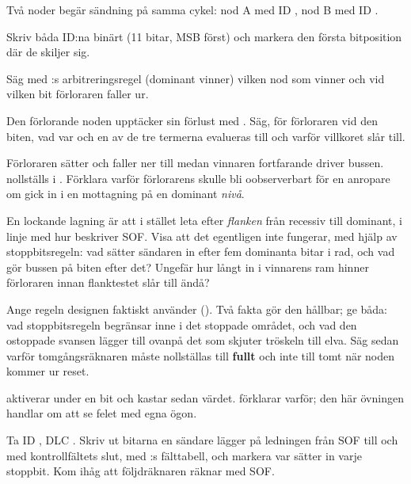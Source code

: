 \label{c17:ex:arbhand}
Två noder begär sändning på samma cykel: nod A med ID , nod B med ID .

 Skriv båda ID:na binärt (11 bitar, MSB först) och markera den första bitposition där de
skiljer sig.

 Säg med :s arbitreringsregel (dominant  vinner) vilken
nod som vinner och vid vilken bit förloraren faller ur.

 Den förlorande noden upptäcker sin förlust med
. Säg, för förloraren vid den biten,
vad var och en av de tre termerna evalueras till och varför villkoret slår till.

 Förloraren sätter  och faller ner till  medan vinnaren
fortfarande driver bussen.  nollställs i . Förklara varför förlorarens
 skulle bli oobserverbart för en anropare om  gick in i en mottagning på
en dominant \emph{nivå}.

 En lockande lagning är att i stället leta efter \emph{flanken} från recessiv till dominant,
i linje med hur  beskriver SOF. Visa att det egentligen inte fungerar,
med hjälp av stoppbitsregeln: vad sätter sändaren in efter fem dominanta bitar i rad, och vad gör
bussen på biten efter det? Ungefär hur långt in i vinnarens ram hinner förloraren innan flanktestet
slår till ändå?

 Ange regeln designen faktiskt använder (). Två fakta gör den
hållbar; ge båda: vad stoppbitsregeln begränsar inne i det stoppade området, och vad den ostoppade
svansen lägger till ovanpå det som skjuter tröskeln till elva. Säg sedan varför tomgångsräknaren
måste nollställas till \textbf{fullt} och inte till tomt när noden kommer ur reset.

\label{c17:ex:sof}
 aktiverar  under en bit och kastar sedan värdet.
 förklarar varför; den här övningen handlar om att se felet med egna ögon.

 Ta ID , DLC . Skriv ut bitarna en sändare lägger på ledningen från SOF
till och med kontrollfältets slut, med :s fälttabell, och markera var
 sätter in varje stoppbit. Kom ihåg att följdräknaren räknar med SOF.

